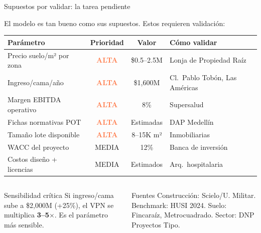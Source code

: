 \documentclass[aspectratio=169, 11pt]{beamer}
\newcommand{\danger}[1]{\textcolor{coral}{\textbf{#1}}}
\begin{document}
{
\begin{frame}{Supuestos por validar: la tarea pendiente}

{\footnotesize El modelo es tan bueno como sus supuestos. Estos requieren validación:}

\vspace{4pt}
{\scriptsize
\begin{tabular}{@{}p{3.8cm}ccl@{}}
\toprule
\textbf{Parámetro} & \textbf{Prioridad} & \textbf{Valor} & \textbf{Cómo validar} \\
\midrule
\rowcolor{coral!8}
Precio suelo/m² por zona & \danger{ALTA} & \$0.5--2.5M & Lonja de Propiedad Raíz \\
\rowcolor{coral!8}
Ingreso/cama/año & \danger{ALTA} & \$1,600M & Cl.\ Pablo Tobón, Las Américas \\
\rowcolor{coral!5}
Margen EBITDA operativo & \danger{ALTA} & 8\% & Supersalud \\
Fichas normativas POT & \danger{ALTA} & Estimadas & DAP Medellín \\
Tamaño lote disponible & \danger{ALTA} & 8--15K m² & Inmobiliarias \\
\rowcolor{amber!10}
WACC del proyecto & MEDIA & 12\% & Banca de inversión \\
\rowcolor{amber!10}
Costos diseño + licencias & MEDIA & Estimados & Arq.\ hospitalaria \\
\bottomrule
\end{tabular}
}

\vspace{6pt}
\begin{columns}[T]
\begin{alertblock}{\small Sensibilidad crítica}
\footnotesize Si ingreso/cama sube a \$2,000M (+25\%), el VPN se multiplica \textbf{3--5$\times$}. Es el parámetro más sensible.
\end{alertblock}

\begin{block}{\small Fuentes}
\footnotesize Construcción: Scielo/U. Militar. Benchmark: HUSI 2024. Suelo: Fincaraíz, Metrocuadrado. Sector: DNP Proyectos Tipo.
\end{block}
\end{columns}
\end{frame}
}
\end{document}

